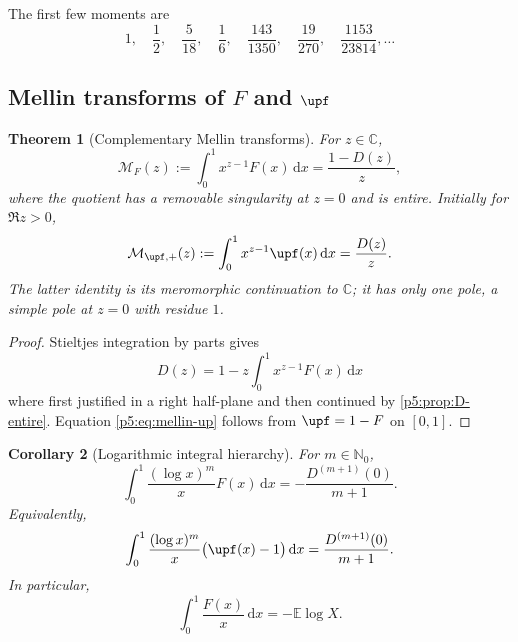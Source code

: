 \documentclass[11pt,oneside]{article}
\newtheorem{theorem}{Theorem}[section]
\newtheorem{corollary}[theorem]{Corollary}
\theoremstyle{definition}
\theoremstyle{remark}
\newcommand{\E}{\mathbb E}
\newcommand{\C}{\mathbb C}
\newcommand{\N}{\mathbb N}
\newcommand{\dd}{\,\mathrm d}
\newcommand{\1}{\mathbf 1}
\begin{document}
The first few moments are
\begin{equation}\label{p5:eq:first-moments}
 1,\quad \frac12,\quad \frac5{18},\quad \frac16,
 \quad \frac{143}{1350},\quad \frac{19}{270},
 \quad \frac{1153}{23814},\ldots
\end{equation}

\subsection{Mellin transforms of $F$ and $\upf$}

\begin{theorem}[Complementary Mellin transforms]\label{p5:thm:mellin-pair}
For $z\in\C$,
\begin{equation}\label{p5:eq:mellin-F}
 \mathcal M_F(z):=\int_0^1x^{z-1}F(x)\dd x
 =\frac{1-D(z)}{z},
\end{equation}
where the quotient has a removable singularity at $z=0$ and is entire.  Initially for $\Re z>0$,
\begin{equation}\label{p5:eq:mellin-up}
 \mathcal M_{\upf,+}(z):=\int_0^1x^{z-1}\upf(x)\dd x
 =\frac{D(z)}{z}.
\end{equation}
The latter identity is its meromorphic continuation to $\C$; it has only one pole, a simple pole at $z=0$ with residue $1$.
\end{theorem}

\begin{proof}
Stieltjes integration by parts gives
\[
 D(z)=1-z\int_0^1x^{z-1}F(x)\dd x
\]
where first justified in a right half-plane and then continued by \cref{p5:prop:D-entire}.  Equation \eqref{p5:eq:mellin-up} follows from $\upf=1-F$ on $[0,1]$.
\end{proof}

\begin{corollary}[Logarithmic integral hierarchy]\label{p5:cor:logarithmic-hierarchy}
For $m\in\N_0$,
\begin{equation}\label{p5:eq:logarithmic-F}
 \int_0^1\frac{(\log x)^m}{x}F(x)\dd x
 =-\frac{D^{(m+1)}(0)}{m+1}.
\end{equation}
Equivalently,
\begin{equation}\label{p5:eq:logarithmic-up-regularized}
 \int_0^1\frac{(\log x)^m}{x}\bigl(\upf(x)-1\bigr)\dd x
 =\frac{D^{(m+1)}(0)}{m+1}.
\end{equation}
In particular,
\begin{equation}\label{p5:eq:ElogX}
 \int_0^1\frac{F(x)}x\dd x=-\E\log X.
\end{equation}
\end{corollary}
\end{document}
